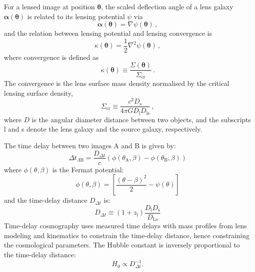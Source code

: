 \documentclass[fleqn,usenatbib]{mnras}
\begin{document}
For a lensed image at position $\boldsymbol{\theta}$, the scaled deflection angle of a lens galaxy $\boldsymbol{\alpha}(\boldsymbol{\theta})$ is related to its lensing potential $\psi$ via
\begin{equation}
\boldsymbol{\alpha}(\boldsymbol{\theta})=\nabla \psi(\boldsymbol{\theta})\,,
\end{equation}
and the relation between lensing potential and lensing convergence is
\begin{equation}
\kappa(\boldsymbol{\theta})=\frac{1}{2} \nabla^2 \psi(\boldsymbol{\theta})\,,
\end{equation}
where convergence is defined as
\begin{equation}
\kappa(\boldsymbol{\theta}) \equiv \frac{\Sigma(\boldsymbol{\theta})}{\Sigma_{\mathrm{cr}}}\,.
\end{equation}
%
The convergence is the lens surface mass density normalised by the critical lensing surface density,
\begin{equation}
\Sigma_{\mathrm{cr}} \equiv \frac{c^2 D_{\mathrm{s}}}{4 \pi G D_{\mathrm{l}} D_{\mathrm{ls}}}\,,
\end{equation}
where \(D\) is the angular diameter distance between two objects, and the subscripts l and s denote the lens galaxy and the source galaxy, respectively.


The time delay between two images A and B is given by:
\begin{equation}
\Delta t_{\Lambda \mathrm{B}}=\frac{D_{\Delta t}}{c}\left(\phi\left(\theta_{\mathrm{A}}, \beta\right)-\phi\left(\theta_{\mathrm{B}}, \beta\right)\right)
\end{equation}
where $\phi(\theta, \beta)$ is the Fermat potential:
\begin{equation}
\phi(\theta, \beta)=\left[\frac{(\theta-\beta)^2}{2}-\psi(\theta)\right]
\end{equation}
and the time-delay distance $D_{\Delta t}$ is:
\begin{equation}
D_{\Delta t} \equiv\left(1+z_{\mathrm{l}}\right) \frac{D_{\mathrm{l}} D_{\mathrm{s}}}{D_{\mathrm{Ls}}}
\end{equation}
Time-delay cosmography uses measured time delays with mass profiles from lens modeling and kinematics to constrain the time-delay distance, hence constraining the cosmological parameters. The Hubble constant is inversely proportional to the time-delay distance:
\begin{equation}
H_0 \propto D_{\Delta t}^{-1} .
\end{equation}
\end{document}
